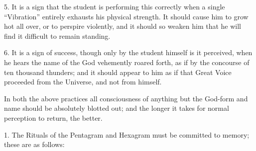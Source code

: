 5. It is a sign that the student is performing this correctly when a single \enquote{Vibration} entirely exhausts his physical strength. It should cause him to grow hot all over, or to perspire violently, and it should so weaken him that he will find it difficult to remain standing.

6. It is a sign of success, though only by the student himself is it perceived, when he hears the name of the God vehemently roared forth, as if by the concourse of ten thousand thunders; and it should appear to him as if that Great Voice proceeded from the Universe, and not from himself.

In both the above practices all consciousness of anything but the God-form and name should be absolutely blotted out; and the longer it takes for normal perception to return, the better.


1. The Rituals of the Pentagram and Hexagram must be committed to memory; these are as follows:

